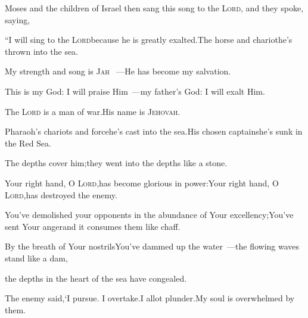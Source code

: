 
\begin{inparaenum}
   Moses and the children of Israel then sang this song to the \textsc{Lord}, and they spoke, saying,\smallskip%
  
  \pb ``I will sing to the \textsc{Lord}\pa because he is greatly exalted.\pa The horse and chariot\pa he's thrown into the sea.%
  
  \pa {} My strength and song is \textsc{Jah}%
  ~---\pa He has become my%
  salvation.%
  
  \pb This is my God: I will praise Him~---\pa my father's God: I will exalt Him.%
  
  \pa {} The \textsc{Lord} is a man%
  of war.\pa His name is \textsc{Jehovah}.%
  
  \pa {} Pharaoh's chariots and force\pa he's cast into the sea.\pa His chosen captains\pa he's sunk in the Red Sea.%
  
  \pa {} The depths cover him;\pa they went into the depths like a stone.%
  
  \pa {} Your right hand, O \textsc{Lord},\pa has become glorious in power:\pa Your right hand, O \textsc{Lord},\pa has destroyed the enemy.%
  
  \pa {} You've demolished your opponents in the abundance of Your excellency;\pa You've sent Your anger\pa and it consumes them like chaff.%
  
  \pa {} By the breath of Your nostrils\pa You've dammed up the water~---\pa the flowing waves stand like a dam,%
  
  \pb the depths in the heart of the sea have congealed.%
  
  \pb {} The enemy said,\pa `I pursue. I overtake.\pa I allot plunder.\pa My soul is overwhelmed by them.%
  

\end{inparaenum}
